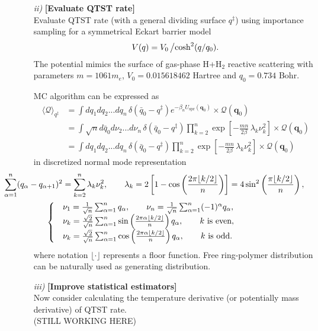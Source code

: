 \documentclass[aip,graphicx,sd, amsmath,amssymb]{revtex4-1}
\begin{document}
\begin{enumerate}
\item[\it{ii})] \textbf{[Evaluate QTST rate]} \\
Evaluate QTST rate (with a general dividing surface $q^{\ddagger}$) using importance sampling for a symmetrical Eckart barrier model 
\begin{align}
V(q) = {V_0} \left/ {\cosh^2 (q/q_0)}. \right. 
\end{align}
The potential mimics the surface of gas-phase H+$\text{H}_2$ reactive scattering with parameters $m=1061m_e$, $V_0=
0.015618462$ Hartree and $q_0=0.734$ Bohr. 

MC algorithm can be expressed as 
\begin{align}
 \langle \mathcal{Q} \rangle_{q^\ddagger} &=
\int dq_1 dq_2 ... dq_n  \hspace{2pt} \delta(\bar{q}_0 - q^\ddagger )  e^{-\beta_n U_{\text{spr}}(\textbf{q}_0)}
 \times \mathcal{Q}(\textbf{q}_0)   \nonumber \\
 &=
\int \sqrt{n} d\bar{q}_0 d\nu_2 ... d\nu_n  \hspace{2pt} \delta(\bar{q}_0 - q^\ddagger )  
\prod_{k=2}^n \exp \left[ -\frac{mn}{2 \beta} \, \lambda_k \nu_k^2 \right]
 \times \mathcal{Q}(\textbf{q}_0)    \nonumber \\
 &=
\int dq_1 dq_2 ... dq_n  \hspace{2pt} \delta(\bar{q}_0 - q^\ddagger ) 
\prod_{k=2}^n \exp \left[ -\frac{mn}{2 \beta} \, \lambda_k \nu_k^2 \right]
 \times \mathcal{Q}(\textbf{q}_0)
\end{align}
in discretized normal mode representation
\begin{align}
& \qquad \hspace{-300pt} \sum_{\alpha=1}^n  (q_\alpha - q_{\alpha+1})^2=\sum_{k=2}^n \lambda_k \nu_k^2, \qquad 
\lambda_k= 2 \left[ 1- \cos \left( \frac{2 \pi \lfloor k/2 \rfloor }n \right) \right] = 4 \sin^2 \left( \frac{\pi \lfloor k/2 \rfloor }n \right),  \nonumber \\
\begin{cases}
&\nu_1=\frac{1}{\sqrt{n}} \sum_{\alpha=1}^n  q_\alpha, \qquad \nu_n=\frac{1}{\sqrt{n}} \sum_{\alpha=1}^n (-1)^\alpha   q_\alpha, \\
&\nu_k=\frac{\sqrt{2}}{\sqrt{n}} \sum_{\alpha=1}^n \sin \left( \frac{2 \pi \alpha \lfloor k/2 \rfloor }n \right) q_\alpha, \qquad k \text{ is even}, \\
&\nu_k=\frac{\sqrt{2}}{\sqrt{n}}  \sum_{\alpha=1}^n \cos \left( \frac{2 \pi \alpha \lfloor k/2 \rfloor }n \right) q_\alpha, \qquad k \text{ is odd}. \\
\end{cases}
\end{align}
where notation $ \lfloor \cdot \rfloor$ represents a floor function. Free ring-polymer distribution can be naturally used as generating distribution.

\item[\it{iii})] \textbf{[Improve statistical estimators]} \\
Now consider calculating the temperature derivative (or potentially mass derivative) of QTST rate. \\
(STILL WORKING HERE)
 
\end{enumerate}
\end{document}

